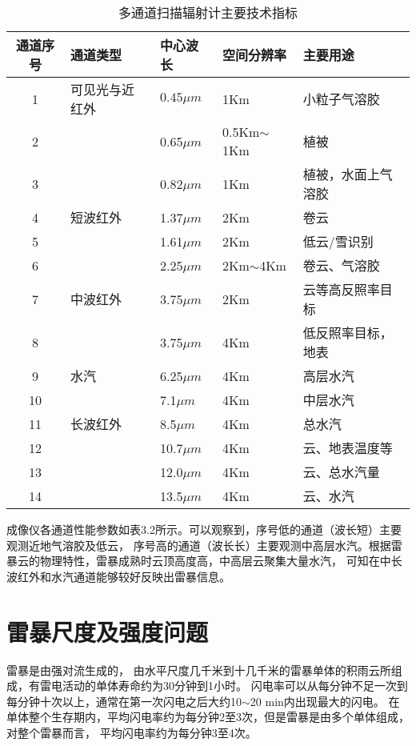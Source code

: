   \begin{table}[htb]
    \centering\small
    \caption{多通道扫描辐射计主要技术指标}
    \label{tab:exampletable}
    \begin{tabular}{cllll}
      \toprule
        通道序号 & 通道类型 & 中心波长  & 空间分辨率 & 主要用途    \\
      \midrule
      1 & 可见光与近红外 & $0.45\mu m$  & 1Km & 小粒子气溶胶 \\
      2 &  & 0.65$\mu m$ & 0.5Km$\sim$1Km & 植被 \\
      3 &  & 0.82$\mu m$ &  1Km & 植被，水面上气溶胶 \\
      4 & 短波红外 & 1.37$\mu m$ & 2Km & 卷云 \\
      5 &  & 1.61$\mu m$  & 2Km & 低云/雪识别 \\
      6 &  & 2.25$\mu m$ & 2Km$\sim$4Km & 卷云、气溶胶 \\
      7 & 中波红外 & 3.75$\mu m$ & 2Km & 云等高反照率目标 \\
      8 &  & 3.75$\mu m$ & 4Km & 低反照率目标，地表 \\
      9 & 水汽 & 6.25$\mu m$  & 4Km & 高层水汽 \\
      10 &  & 7.1$\mu m$  & 4Km & 中层水汽 \\
      11 & 长波红外 & 8.5$\mu m$  & 4Km & 总水汽\\
      12 &  & 10.7$\mu m$  & 4Km & 云、地表温度等 \\
      13 &  & 12.0$\mu m$  & 4Km & 云、总水汽量\\
      14 &  & 13.5$\mu m$ & 4Km & 云、水汽 \\
      \bottomrule
    \end{tabular}
  \end{table}
  
成像仪各通道性能参数如表3.2所示。可以观察到，序号低的通道（波长短）主要观测近地气溶胶及低云，
序号高的通道（波长长）主要观测中高层水汽。根据雷暴云的物理特性，雷暴成熟时云顶高度高，中高层云聚集大量水汽，
可知在中长波红外和水汽通道能够较好反映出雷暴信息。


\section{雷暴尺度及强度问题}
雷暴是由强对流生成的，
由水平尺度几千米到十几千米的雷暴单体的积雨云所组成，有雷电活动的单体寿命约为30分钟到1小时。
闪电率可以从每分钟不足一次到每分钟十次以上，通常在第一次闪电之后大约10$\sim$20 min内出现最大的闪电。
在单体整个生存期内，平均闪电率约为每分钟2至3次，但是雷暴是由多个单体组成，对整个雷暴而言，
平均闪电率约为每分钟3至4次。


